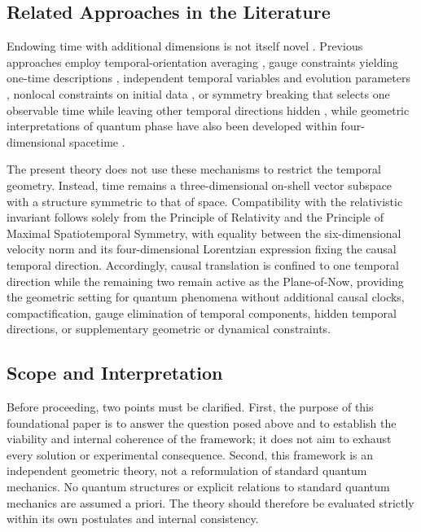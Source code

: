 \subsection{Related Approaches in the Literature}
Endowing time with additional dimensions is not itself novel \cite{demers1975_vector_time,cole1980_particle_decay,kletetschka2025_three_dimensional_time}. Previous approaches employ temporal-orientation averaging \cite{cole1978_six_dimensional_relativity}, gauge constraints yielding one-time descriptions \cite{bars2000_2t_field_theory,bars_rey2001_sp2r_2t}, independent temporal variables and evolution parameters \cite{dirac1932_relativistic_qm,petrat_tumulka2014_multitime_qft,stueckelberg1941_temps_propre,horwitz_piron1973_relativistic_dynamics}, nonlocal constraints on initial data \cite{craig_weinstein2009_multiple_time}, or symmetry breaking that selects one observable time while leaving other temporal directions hidden \cite{DartoraCabrera2010}, while geometric interpretations of quantum phase have also been developed within four-dimensional spacetime \cite{hestenes2015_spacetime_algebra,hestenes1967_real_spinor_fields}.

The present theory does not use these mechanisms to restrict the temporal geometry. Instead, time remains a three-dimensional on-shell vector subspace with a structure symmetric to that of space. Compatibility with the relativistic invariant follows solely from the Principle of Relativity and the Principle of Maximal Spatiotemporal Symmetry, with equality between the six-dimensional velocity norm and its four-dimensional Lorentzian expression fixing the causal temporal direction. Accordingly, causal translation is confined to one temporal direction while the remaining two remain active as the Plane-of-Now, providing the geometric setting for quantum phenomena without additional causal clocks, compactification, gauge elimination of temporal components, hidden temporal directions, or supplementary geometric or dynamical constraints.

\subsection{Scope and Interpretation}
Before proceeding, two points must be clarified. First, the purpose of this foundational paper is to answer the question posed above and to establish the viability and internal coherence of the framework; it does not aim to exhaust every solution or experimental consequence. Second, this framework is an independent geometric theory, not a reformulation of standard quantum mechanics. No quantum structures or explicit relations to standard quantum mechanics are assumed a priori. The theory should therefore be evaluated strictly within its own postulates and internal consistency.

